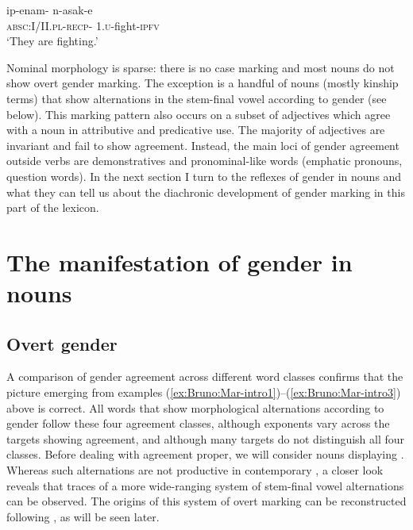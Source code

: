 \documentclass[output=collectionpaper]{langsci/langscibook}
\begin{document}
\ea\label{ex:Bruno:fight}
\gll ip-enam- n-asak-e\\
\textsc{absc}:I/II.\textsc{pl}-\textsc{recp}- 1.\textsc{u}-fight-\textsc{ipfv}\\
\glt `They are fighting.'
\z

Nominal morphology is sparse: there is no case marking and most nouns do not show overt gender marking. The exception is a handful of nouns (mostly kinship terms) that show alternations in the stem-final vowel according to gender (see below). This marking pattern also occurs on a subset of adjectives which agree with a noun in attributive and predicative use. The majority of adjectives are invariant and fail to show agreement. Instead, the main loci of gender agreement outside verbs are demonstratives and pronominal-like words (emphatic pronouns, question words). In the next section I turn to the reflexes of gender in nouns and what they can tell us about the diachronic development of gender marking in this part of the lexicon.

\section{The manifestation of gender in nouns}
\label{sec:Bruno:4genders}
\subsection{Overt gender}
\label{sec:Bruno:2.1}
A comparison of gender agreement across different word classes confirms that the picture emerging from examples (\ref{ex:Bruno:Mar-intro1})--(\ref{ex:Bruno:Mar-intro3}) above is correct. All words that show morphological alternations according to gender follow these four agreement classes, although exponents vary across the targets showing agreement, and although many targets do not distinguish all four classes. Before dealing with agreement proper, we will consider nouns displaying . Whereas such alternations are not productive in contemporary , a closer look reveals that traces of a more wide-ranging system of stem-final vowel alternations can be observed. The origins of this system of overt marking can be reconstructed following \cite{Usher2015}, as will be seen later.
\end{document}
